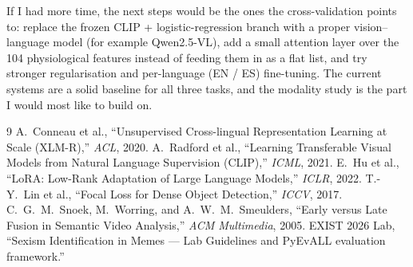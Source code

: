 \documentclass[11pt,a4paper]{article}
\begin{document}
If I had more time, the next steps would be the ones the cross-validation points to: replace the
frozen CLIP + logistic-regression branch with a proper vision--language model (for example
Qwen2.5-VL), add a small attention layer over the 104 physiological features
instead of feeding them in as a flat list, and try stronger regularisation and per-language
(EN / ES) fine-tuning. The current systems are a solid baseline for all three tasks, and the
modality study is the part I would most like to build on.

\begin{thebibliography}{9}\small
{} A.\ Conneau et al., ``Unsupervised Cross-lingual Representation Learning at Scale
(XLM-R),'' \emph{ACL}, 2020.
 A.\ Radford et al., ``Learning Transferable Visual Models from Natural Language
Supervision (CLIP),'' \emph{ICML}, 2021.
 E.\ Hu et al., ``LoRA: Low-Rank Adaptation of Large Language Models,''
\emph{ICLR}, 2022.
 T.-Y.\ Lin et al., ``Focal Loss for Dense Object Detection,''
\emph{ICCV}, 2017.
 C.~G.~M.\ Snoek, M.\ Worring, and A.~W.~M.\ Smeulders, ``Early versus Late
Fusion in Semantic Video Analysis,'' \emph{ACM Multimedia}, 2005.
 EXIST 2026 Lab, ``Sexism Identification in Memes --- Lab Guidelines and PyEvALL
evaluation framework.''
\end{thebibliography}
\end{document}
